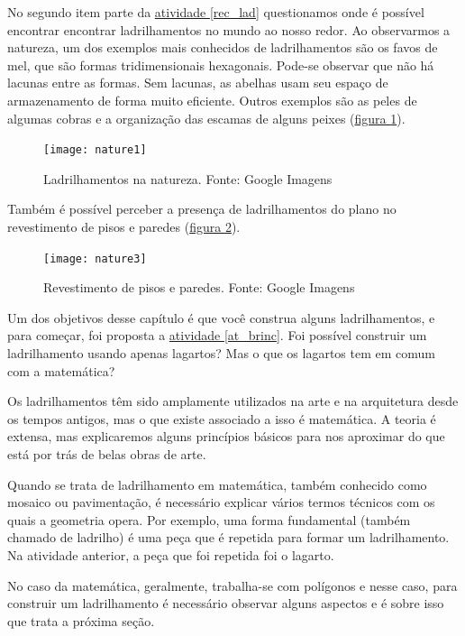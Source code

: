 No segundo item parte da  \hyperref[rec_lad]{atividade \ref{rec_lad}} questionamos onde é possível encontrar encontrar ladrilhamentos no mundo ao nosso redor. 
Ao observarmos a natureza, um dos exemplos mais conhecidos de ladrilhamentos são os favos de mel, que são formas tridimensionais hexagonais. Pode-se observar que não há lacunas entre as formas. Sem lacunas, as abelhas usam seu espaço de armazenamento de forma muito eficiente. Outros exemplos são as peles de algumas cobras e a organização das escamas de alguns peixes (\hyperref[natureza]{figura \ref{natureza}}).


\begin{figure}[H]
\centering
\texttt{[image: nature1]}
\caption{Ladrilhamentos na natureza. Fonte: Google Imagens}
\label{natureza}
\end{figure}

Também é possível perceber a presença de ladrilhamentos do plano no revestimento de pisos e paredes (\hyperref[natureza1]{figura \ref{natureza1}}). 


\begin{figure}[H]
\centering
\texttt{[image: nature3]}
\caption{Revestimento de pisos e paredes. Fonte: Google Imagens}
\label{natureza1}
\end{figure}

Um dos objetivos desse capítulo é que você construa alguns ladrilhamentos, e para começar, foi proposta a \hyperref[at_brinc]{atividade \ref{at_brinc}}. Foi possível construir um ladrilhamento usando apenas lagartos?  Mas o que os lagartos tem em comum com a matemática? 

Os ladrilhamentos têm sido amplamente utilizados na arte e na arquitetura desde os tempos antigos, mas o que existe associado a isso é  matemática. A teoria é extensa, mas explicaremos alguns princípios básicos para nos aproximar do que está por trás de belas obras de arte. 

Quando se trata de ladrilhamento em matemática, também conhecido como mosaico ou pavimentação, é necessário explicar vários termos técnicos com os quais a geometria opera. Por exemplo, uma forma fundamental (também chamado de ladrilho) é uma peça que é repetida para formar um ladrilhamento. Na atividade anterior, a peça que foi repetida foi o lagarto.


No caso da matemática, geralmente, trabalha-se com polígonos e nesse caso, para construir um ladrilhamento é necessário observar alguns aspectos e é sobre isso que trata a próxima seção.


